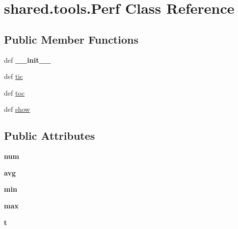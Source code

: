 \hypertarget{classshared_1_1tools_1_1_perf}{\section{shared.\-tools.\-Perf \-Class \-Reference}
\label{classshared_1_1tools_1_1_perf}
}
\subsection*{\-Public \-Member \-Functions}
\begin{DoxyCompactItemize}
\item 
\hypertarget{classshared_1_1tools_1_1_perf_a866e6009ae954a6055d6d88dcb216b8c}{def {\bfseries \-\_\-\-\_\-init\-\_\-\-\_\-}}\label{classshared_1_1tools_1_1_perf_a866e6009ae954a6055d6d88dcb216b8c}

\item 
def \hyperlink{classshared_1_1tools_1_1_perf_ae563e88c27acd14a7b3b0f6e591d529c}{tic}
\item 
def \hyperlink{classshared_1_1tools_1_1_perf_a04fabcb48a0a330ca6cb9d02574c874f}{toc}
\item 
def \hyperlink{classshared_1_1tools_1_1_perf_a49dc229212649947ae4fc3782825bf0f}{show}
\end{DoxyCompactItemize}
\subsection*{\-Public \-Attributes}
\begin{DoxyCompactItemize}
\item 
\hypertarget{classshared_1_1tools_1_1_perf_a546fa9397e5a178fd73cb128c3a06d1e}{{\bfseries num}}\label{classshared_1_1tools_1_1_perf_a546fa9397e5a178fd73cb128c3a06d1e}

\item 
\hypertarget{classshared_1_1tools_1_1_perf_a2152120c4f61228562f8d1b2bc1792f5}{{\bfseries avg}}\label{classshared_1_1tools_1_1_perf_a2152120c4f61228562f8d1b2bc1792f5}

\item 
\hypertarget{classshared_1_1tools_1_1_perf_a60b122cad13dd057feeae4ae71abedc3}{{\bfseries min}}\label{classshared_1_1tools_1_1_perf_a60b122cad13dd057feeae4ae71abedc3}

\item 
\hypertarget{classshared_1_1tools_1_1_perf_a5842e3f78ebc49122925f0a99e7d010c}{{\bfseries max}}\label{classshared_1_1tools_1_1_perf_a5842e3f78ebc49122925f0a99e7d010c}

\item 
\hypertarget{classshared_1_1tools_1_1_perf_ae65b5785ae411cdff0704406449b0a67}{{\bfseries t}}\label{classshared_1_1tools_1_1_perf_ae65b5785ae411cdff0704406449b0a67}

\end{DoxyCompactItemize}


